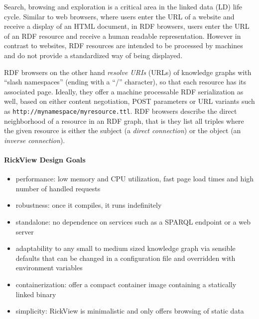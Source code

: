 \documentclass[runningheads]{llncs}
\newcommand\citep[1]{\cite{#1}}
\begin{document}
Search, browsing and exploration is a critical area in the linked data (LD) life cycle.
Similar to web browsers, where users enter the URL of a website and receive a display of an HTML document, in RDF browsers,
users enter the URL of an RDF resource and receive a human readable representation.
However in contrast to websites, RDF resources are intended to be processed by machines and do not provide a standardized way of being displayed.
\citep{adaptinglodview}

RDF browsers on the other hand \emph{resolve URIs} (URLs) of knowledge graphs with \enquote{slash namespaces} (ending with a \enquote{/} character), so that each resource has its associated page.
Ideally, they offer a machine processable RDF serialization as well, based on either content negotiation, POST parameters or URL variants such as \texttt{http://mynamespace/myresource.ttl}.
RDF browsers describe the direct neighborhood of a resource in an RDF graph, that is they list all triples where the given resource is either the subject (a \emph{direct connection}) or the object (an \emph{inverse connection}).

\paragraph{RickView Design Goals}
\begin{itemize}
\item
  performance: low memory and CPU utilization, fast page load times and high number of handled requests
\item
  robustness: once it compiles, it runs indefinitely
\item
  standalone: no dependence on services such as a SPARQL endpoint or a web server
\item
  adaptability to any small to medium sized knowledge graph via sensible defaults that can be changed in a configuration file and overridden with environment variables
\item
  containerization: offer a compact container image containing a statically linked binary
\item
  simplicity: RickView is minimalistic and only offers browsing of static data
\end{itemize}
\end{document}

